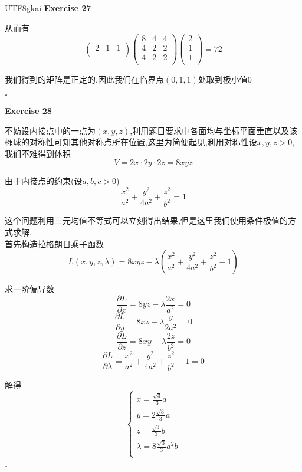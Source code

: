 \documentclass[11pt,hyperref,a4paper,UTF8]{ctexart}
\newenvironment{exercise}[1]{%
{\textbf{Exercise #1} \\ 
    }
}{
  \hfill $\square$ 
  \par\bigskip 
}
\newcommand{\parameter}[1]{\left(#1\right)}
\begin{document}
\begin{CJK}{UTF8}{gkai}
\begin{exercise}{27}
    从而有
    \[\begin{pmatrix}
        2&1&1\\
    \end{pmatrix}
    \begin{pmatrix}
        8&4&4\\
        4&2&2\\
        4&2&2\\
    \end{pmatrix}
    \begin{pmatrix}
        2\\
        1\\
        1\\
    \end{pmatrix}
    =
    72
    \]

    我们得到的矩阵是正定的,因此我们在临界点$(0,1,1)$处取到极小值$0$
\end{exercise}

\begin{exercise}{28}
    不妨设内接点中的一点为$(x,y,z)$,利用题目要求中各面均与坐标平面垂直以及该椭球的对称性可知其他对称点所在位置,这里为简便起见,利用对称性设$x,y,z > 0$,我们不难得到体积
    \[V = 2 x \cdot 2 y \cdot 2 z = 8 x y z\]

    由于内接点的约束(设$a,b,c > 0$)
    \[\frac{x^2}{a^2} + \frac{y^2}{4 a^2} + \frac{z^2}{b^2} = 1\]

    这个问题利用三元均值不等式可以立刻得出结果,但是这里我们使用条件极值的方式求解.\\

    首先构造拉格朗日乘子函数
    \[L(x,y,z,\lambda) = 8xyz - \lambda \parameter{\frac{x^2}{a^2} + \frac{y^2}{4 a^2} + \frac{z^2}{b^2} - 1}\]

    求一阶偏导数
    \[\frac{\partial L}{\partial x} = 8yz - \lambda \frac{2x}{a^2} = 0\]
    \[\frac{\partial L}{\partial y} = 8xz - \lambda \frac{y}{2a^2} = 0\]
    \[\frac{\partial L}{\partial z} = 8xy - \lambda \frac{2z}{b^2} = 0\]
    \[\frac{\partial L}{\partial \lambda} = \frac{x^2}{a^2} + \frac{y^2}{4 a^2} + \frac{z^2}{b^2} - 1 = 0\]

    解得
    \[\begin{cases}
        x = \frac{\sqrt{3}}{3} a\\

        y = 2\frac{\sqrt{3}}{3} a\\

        z = \frac{\sqrt{3}}{3} b\\

        \lambda = 8\frac{\sqrt{3}}{3} a^2 b\\
    \end{cases}\]


\end{exercise}
\end{CJK}
\end{document}
